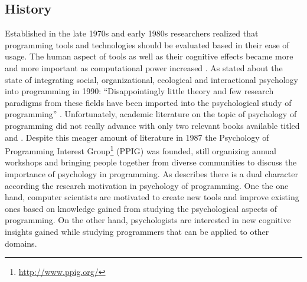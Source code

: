 \subsection{History}
\label{history-of-psychology-of-programming}
Established in the late 1970s and early 1980s researchers realized that programming tools and technologies should be evaluated based in their ease of usage.
The human aspect of tools as well as their cognitive effects became more and more important as computational power increased \autocite{sajaniemi_psychology_2008}.
As \citeauthor{curtis_psychology_1990} stated about the state of integrating social, organizational, ecological and interactional psychology into programming in 1990: ``Disappointingly little theory and few research paradigms from these fields have been imported into the psychological study of programming'' \autocite[253]{curtis_psychology_1990}.
Unfortunately, academic literature on the topic of psychology of programming did not really advance with only two relevant books available titled  \autocite{weinberg_psychology_1971} and  \autocite{hoc_psychology_1990}.
Despite this meager amount of literature in 1987 the Psychology of Programming Interest Group\footnote{\url{http://www.ppig.org/}} (PPIG) was founded, still organizing annual workshops and bringing people together from diverse communities to discuss the importance of psychology in programming.
As \textcite{sajaniemi_psychology_2008} describes there is a dual character according the research motivation in psychology of programming.
One the one hand, computer scientists are motivated to create new tools and improve existing ones based on knowledge gained from studying the psychological aspects of programming.
On the other hand, psychologists are interested in new cognitive insights gained while studying programmers that can be applied to other domains.

